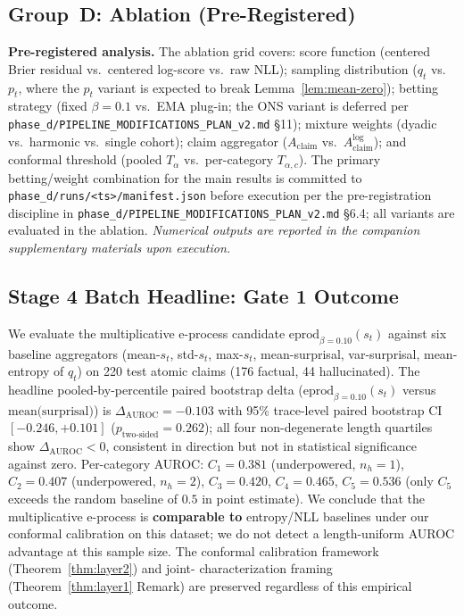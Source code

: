 \documentclass[runningheads]{llncs}
\newcommand{\claimscore}{A_{\text{claim}}}
\newcommand{\claimscorelog}{A_{\text{claim}}^{\log}}
\begin{document}
\subsection{Group~D: Ablation (Pre-Registered)}
\label{ssec:results-groupD}

\textbf{Pre-registered analysis.} The ablation grid covers: score function
(centered Brier residual vs.\ centered log-score vs.\ raw NLL); sampling
distribution ($q_t$ vs.\ $p_t$, where the $p_t$ variant is expected to
break Lemma~\ref{lem:mean-zero}); betting strategy (fixed $\beta=0.1$
vs.\ EMA plug-in; the ONS variant is deferred per
\texttt{phase\_d/PIPELINE\_MODIFICATIONS\_PLAN\_v2.md} §11); mixture
weights (dyadic vs.\ harmonic vs.\ single cohort); claim aggregator
($\claimscore$ vs.\ $\claimscorelog$); and conformal threshold (pooled
$T_\alpha$ vs.\ per-category $T_{\alpha,c}$). The primary betting/weight
combination for the main results is committed to
\texttt{phase\_d/runs/<ts>/manifest.json} before execution per the
pre-registration discipline in
\texttt{phase\_d/PIPELINE\_MODIFICATIONS\_PLAN\_v2.md} §6.4; all variants
are evaluated in the ablation. \emph{Numerical outputs are reported in the
companion supplementary materials upon execution.}

\subsection{Stage 4 Batch Headline: Gate 1 Outcome}
\label{ssec:results-batch}

We evaluate the multiplicative e-process candidate
$\text{eprod}_{\beta=0.10}(s_t)$ against six baseline aggregators
(mean-$s_t$, std-$s_t$, max-$s_t$, mean-surprisal, var-surprisal,
mean-entropy of $q_t$) on 220 test atomic claims (176 factual, 44
hallucinated). The headline pooled-by-percentile paired bootstrap delta
($\text{eprod}_{\beta=0.10}(s_t)$ versus $\text{mean(surprisal)}$) is
$\Delta_{\text{AUROC}} = -0.103$ with 95\% trace-level paired bootstrap CI
$[-0.246, +0.101]$ ($p_{\text{two-sided}} = 0.262$); all four non-degenerate
length quartiles show $\Delta_{\text{AUROC}} < 0$, consistent in direction
but not in statistical significance against zero.
Per-category AUROC: $C_1 = 0.381$ (underpowered, $n_h = 1$),
$C_2 = 0.407$ (underpowered, $n_h = 2$), $C_3 = 0.420$, $C_4 = 0.465$,
$C_5 = 0.536$ (only $C_5$ exceeds the random baseline of $0.5$ in point
estimate).
We conclude that the multiplicative e-process is \textbf{comparable to}
entropy/NLL baselines under our conformal calibration on this dataset; we
do not detect a length-uniform AUROC advantage at this sample size. The
conformal calibration framework (Theorem~\ref{thm:layer2}) and joint-
characterization framing (Theorem~\ref{thm:layer1} Remark) are preserved
regardless of this empirical outcome.
\end{document}
